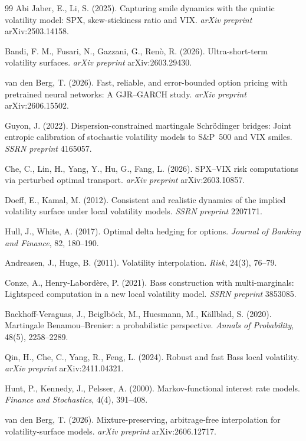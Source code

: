 \documentclass[11pt]{article}
\begin{document}
\begin{thebibliography}{99}
Abi Jaber, E., Li, S. (2025).
Capturing smile dynamics with the quintic volatility model: SPX, skew-stickiness
ratio and VIX. \textit{arXiv preprint} arXiv:2503.14158.

 Bandi, F. M., Fusari, N., Gazzani, G., Ren\`o, R. (2026). Ultra-short-term volatility surfaces. \emph{arXiv preprint} arXiv:2603.29430.

van den Berg, T. (2026).
Fast, reliable, and error-bounded option pricing with pretrained neural networks:
A GJR--GARCH study. \textit{arXiv preprint} arXiv:2606.15502.

Guyon, J. (2022).
Dispersion-constrained martingale Schr\"odinger bridges: Joint entropic calibration of
stochastic volatility models to S\&P~500 and VIX smiles.
\textit{SSRN preprint} 4165057.

Che, C., Lin, H., Yang, Y., Hu, G., Fang, L. (2026). SPX--VIX risk computations via perturbed optimal
transport. \textit{arXiv preprint} arXiv:2603.10857.

 Doeff, E., Kamal, M. (2012). Consistent and realistic dynamics of the implied volatility surface under local volatility models. \emph{SSRN preprint} 2207171.

Hull, J., White, A. (2017). Optimal delta hedging for options.
\textit{Journal of Banking and Finance}, 82, 180--190.

Andreasen, J., Huge, B. (2011). Volatility interpolation. \textit{Risk}, 24(3), 76--79.

Conze, A., Henry-Labord\`ere, P. (2021). Bass construction with multi-marginals: Lightspeed
computation in a new local volatility model. \textit{SSRN preprint} 3853085.

Backhoff-Veraguas, J., Beiglb\"ock, M., Huesmann, M., K\"allblad, S. (2020). Martingale
Benamou--Brenier: a probabilistic perspective. \textit{Annals of Probability}, 48(5), 2258--2289.

Qin, H., Che, C., Yang, R., Feng, L. (2024). Robust and fast Bass local volatility.
\textit{arXiv preprint} arXiv:2411.04321.

Hunt, P., Kennedy, J., Pelsser, A. (2000). Markov-functional interest rate models.
\textit{Finance and Stochastics}, 4(4), 391--408.

van den Berg, T. (2026). Mixture-preserving, arbitrage-free interpolation for volatility-surface
models. \textit{arXiv preprint} arXiv:2606.12717.

\end{thebibliography}
\end{document}
